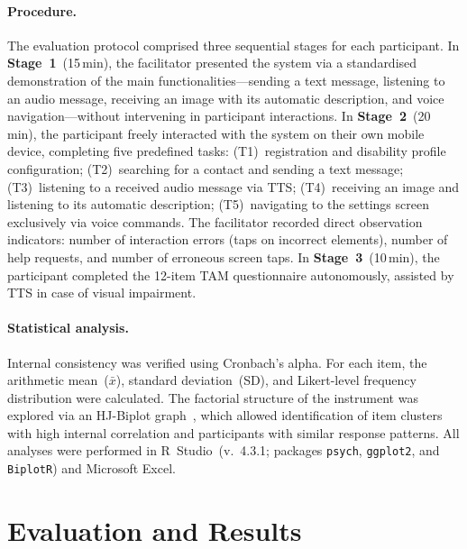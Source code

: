 \documentclass[journal]{IEEEtran}
\begin{document}
	\paragraph{Procedure.}
	The evaluation protocol comprised three sequential stages
	for each participant.
	In \textbf{Stage~1}~(15\,min), the facilitator presented
	the system via a standardised demonstration of the main
	functionalities---sending a text message, listening to an audio
	message, receiving an image with its automatic description,
	and voice navigation---without intervening in participant
	interactions.
	In \textbf{Stage~2}~(20\,min), the participant freely
	interacted with the system on their own mobile device,
	completing five predefined tasks: (T1)~registration and
	disability profile configuration; (T2)~searching for a contact
	and sending a text message; (T3)~listening to a received audio
	message via TTS; (T4)~receiving an image and listening to its
	automatic description; (T5)~navigating to the settings screen
	exclusively via voice commands.
	The facilitator recorded direct observation indicators:
	number of interaction errors (taps on incorrect elements),
	number of help requests, and number of erroneous screen taps.
	In \textbf{Stage~3}~(10\,min), the participant completed the
	12-item TAM questionnaire autonomously, assisted by TTS in case
	of visual impairment.
	
	\paragraph{Statistical analysis.}
	Internal consistency was verified using Cronbach's alpha.
	For each item, the arithmetic mean~($\bar{x}$), standard
	deviation~(SD), and Likert-level frequency distribution were
	calculated.
	The factorial structure of the instrument was explored via
	an HJ-Biplot graph~\cite{galindo1986,cubilla2021},
	which allowed identification of item clusters with high
	internal correlation and participants with similar response
	patterns.
	All analyses were performed in R~Studio~(v.~4.3.1;
	packages \texttt{psych}, \texttt{ggplot2}, and \texttt{BiplotR})
	and Microsoft Excel.
	
	\section{Evaluation and Results}
	\label{sec:evaluation}
	
\end{document}
